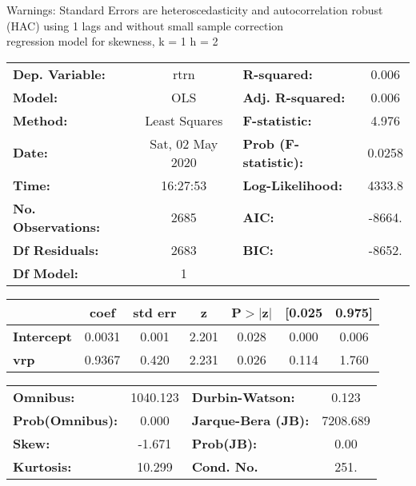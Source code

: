 Warnings: \newline
 [1] Standard Errors are heteroscedasticity and autocorrelation robust (HAC) using 1 lags and without small sample correction\\ 

regression model for skewness, k = 1 h = 2\begin{center}
\begin{tabular}{lclc}
\toprule
\textbf{Dep. Variable:}    &       rtrn       & \textbf{  R-squared:         } &     0.006   \\
\textbf{Model:}            &       OLS        & \textbf{  Adj. R-squared:    } &     0.006   \\
\textbf{Method:}           &  Least Squares   & \textbf{  F-statistic:       } &     4.976   \\
\textbf{Date:}             & Sat, 02 May 2020 & \textbf{  Prob (F-statistic):} &   0.0258    \\
\textbf{Time:}             &     16:27:53     & \textbf{  Log-Likelihood:    } &    4333.8   \\
\textbf{No. Observations:} &        2685      & \textbf{  AIC:               } &    -8664.   \\
\textbf{Df Residuals:}     &        2683      & \textbf{  BIC:               } &    -8652.   \\
\textbf{Df Model:}         &           1      & \textbf{                     } &             \\
\bottomrule
\end{tabular}
\begin{tabular}{lcccccc}
                   & \textbf{coef} & \textbf{std err} & \textbf{z} & \textbf{P$> |$z$|$} & \textbf{[0.025} & \textbf{0.975]}  \\
\midrule
\textbf{Intercept} &       0.0031  &        0.001     &     2.201  &         0.028        &        0.000    &        0.006     \\
\textbf{vrp}       &       0.9367  &        0.420     &     2.231  &         0.026        &        0.114    &        1.760     \\
\bottomrule
\end{tabular}
\begin{tabular}{lclc}
\textbf{Omnibus:}       & 1040.123 & \textbf{  Durbin-Watson:     } &    0.123  \\
\textbf{Prob(Omnibus):} &   0.000  & \textbf{  Jarque-Bera (JB):  } & 7208.689  \\
\textbf{Skew:}          &  -1.671  & \textbf{  Prob(JB):          } &     0.00  \\
\textbf{Kurtosis:}      &  10.299  & \textbf{  Cond. No.          } &     251.  \\
\bottomrule
\end{tabular}
\end{center}

